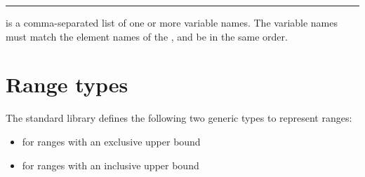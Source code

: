 \begin{grammar}
\rule{tuple-unpack-statement}  \code{=}  \code{;}
\end{grammar}

 is a comma-separated list of one or more variable
names. The variable names must match the element names of the
, and be in the same order.

\section{Range types}

The standard library defines the following two generic types to represent
ranges:

\begin{itemize}
\item {} for ranges with an exclusive upper bound
\item {} for ranges with an inclusive upper bound
\end{itemize}
